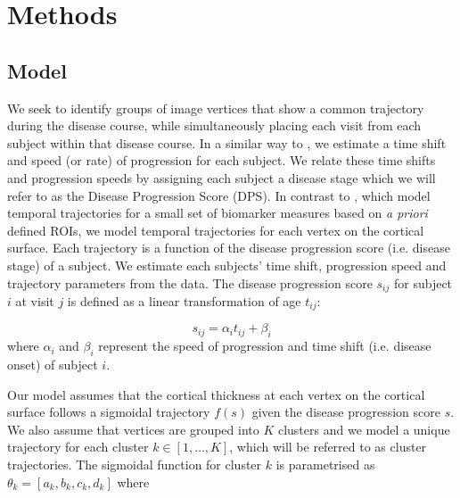 \documentclass{llncs}
\begin{document}

\section{Methods}

\subsection{Model}

We seek to identify groups of image vertices that show a common trajectory during the disease course, while simultaneously placing each visit from each subject within that disease course. In a similar way to \cite{jedynak2012,donohue2014estimating,schiratti2015mixed}, we estimate a time shift and speed (or rate) of progression for each subject. We relate these time shifts and progression speeds by assigning each subject a disease stage which we will refer to as the Disease Progression Score (DPS). In contrast to \cite{jedynak2012,donohue2014estimating,schiratti2015mixed}, which model temporal trajectories for a small set of biomarker measures based on \emph{a priori} defined ROIs, we model temporal trajectories for each vertex on the cortical surface. Each trajectory is a function of the disease progression score (i.e. disease stage) of a subject. We estimate each subjects' time shift, progression speed and trajectory parameters from the data. The disease progression score $s_{ij}$ for subject $i$ at visit $j$ is defined as a linear transformation of age $t_{ij}$:

\begin{equation}
\label{eq:dps}
 s_{ij} = \alpha_i t_{ij} + \beta_i
\end{equation}
where $\alpha_i$ and $\beta_i$ represent the speed of progression and time shift (i.e. disease onset) of subject $i$. 

Our model assumes that the cortical thickness at each vertex on the cortical surface follows a sigmoidal trajectory $f(s)$ given the disease progression score $s$. We also assume that vertices are grouped into $K$ clusters and we model a unique trajectory for each cluster $k \in [1, \dots, K]$, which will be referred to as cluster trajectories. The sigmoidal function for cluster $k$ is parametrised as $\theta_k = [a_k,b_k,c_k,d_k]$ where 
\end{document}
